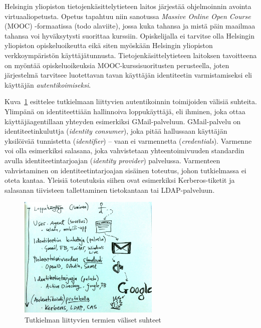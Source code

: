 \documentclass[finnish,gradu]{tktltiki}
\begin{document}
  Helsingin yliopiston tietojenkäsittelytieteen laitos järjestää ohjelmoinnin avointa virtuaaliopetusta. Opetus tapahtuu niin sanotussa \emph{Massive Online Open Course} (MOOC) -formaatissa (todo alaviite), jossa kuka tahansa ja mistä päin maailmaa tahansa voi hyväksytysti suorittaa kurssiin. Opiskelijalla ei tarvitse olla Helsingin yliopiston opiskeluoikeutta eikä siten myöskään Helsingin yliopiston verkkoympäristön käyttäjätunnusta. Tietojenkäsittelytieteen laitoksen tavoitteena on myöntää opiskeluoikeuksia MOOC-kurssisuoritusten perusteella, joten järjestelmä tarvitsee luotettavan tavan käyttäjän identiteetin varmistamiseksi eli käyttäjän \emph{autentikoimiseksi}.

  Kuva~\ref{fig:yleiskuva_termien_suhteista} esittelee tutkielmaan liittyvien autentikoinnin toimijoiden välisiä suhteita. Ylimpänä on identiteettiään hallinnoiva loppukäyttäjä, eli ihminen, joka ottaa käyttäjäagentillaan yhteyden esimerkiksi GMail-palveluun. GMail-palvelu on identiteetinkuluttja (\emph{identity consumer}), joka pitää hallussaan käyttäjän yksilöivää tunnistetta (\emph{identifier}) -- vaan ei varmennetta (\emph{credentials}). Varmenne voi olla esimerkiksi salasana, joka vahvistetaan yhteentoimivuuden standardin avulla identiteetintarjoajan (\emph{identity provider}) palvelussa. Varmenteen vahvistaminen on identiteetintarjoajan sisäinen toteutus, johon tutkielmassa ei oteta kantaa. Yleisiä toteutuksia siihen ovat esimerkiksi Kerberos-tiketit ja salasanan tiivisteen tallettaminen tietokantaan tai LDAP-palveluun.

  \begin{figure}[h!]
    \centering
    \includegraphics[width=0.6\textwidth]{images/auth_yleiskuva.jpg}
    \caption{Tutkielman liittyvien termien väliset suhteet}
    \label{fig:yleiskuva_termien_suhteista}
  \end{figure}
\end{document}
